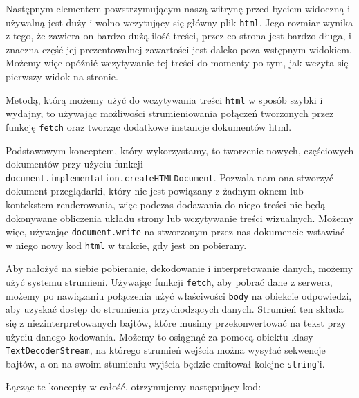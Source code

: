\documentclass[licencjacka]{pracadypl}
\begin{document}
Następnym elementem powstrzymującym naszą witrynę przed byciem widoczną i używalną jest duży i wolno wczytujący się główny plik \texttt{html}. Jego rozmiar wynika z tego, że zawiera on bardzo dużą ilość treści, przez co strona jest bardzo długa, i znaczna część jej prezentowalnej zawartości jest daleko poza wstępnym widokiem. Możemy więc opóźnić wczytywanie tej treści do momenty po tym, jak wczyta się pierwszy widok na stronie.

Metodą, którą możemy użyć do wczytywania treści \texttt{html} w sposób szybki i wydajny, to używając możliwości strumieniowania połączeń tworzonych przez funkcję \texttt{fetch} oraz tworząc dodatkowe instancje dokumentów html.

Podstawowym konceptem, który wykorzystamy, to tworzenie nowych, częściowych dokumentów przy użyciu funkcji \texttt{document.implementation.createHTMLDocument}. Pozwala nam ona stworzyć dokument przeglądarki, który nie jest powiązany z żadnym oknem lub kontekstem renderowania, więc podczas dodawania do niego treści nie będą dokonywane obliczenia układu strony lub wczytywanie treści wizualnych. Możemy więc, używając \texttt{document.write} na stworzonym przez nas dokumencie wstawiać w niego nowy kod \texttt{html} w trakcie, gdy jest on pobierany.

Aby nałożyć na siebie pobieranie, dekodowanie i interpretowanie danych, możemy użyć systemu strumieni. Używając funkcji \texttt{fetch}, aby pobrać dane z serwera, możemy po nawiązaniu połączenia użyć właściwości \texttt{body} na obiekcie odpowiedzi, aby uzyskać dostęp do strumienia przychodzących danych. Strumień ten składa się z niezinterpretowanych bajtów, które musimy przekonwertować na tekst przy użyciu danego kodowania. Możemy to osiągnąć za pomocą obiektu klasy \texttt{TextDecoderStream}, na którego strumień wejścia można wysyłać sekwencje bajtów, a on na swoim stumieniu wyjścia będzie emitował kolejne \texttt{string}'i. 

Łącząc te koncepty w całość, otrzymujemy następujący kod:
\end{document}
